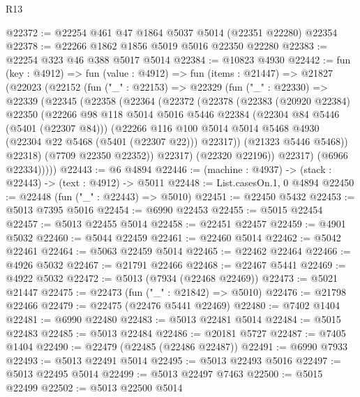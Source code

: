 \begin{lexlean}{R13}
\begin{coremodule}
@22372 := @22254 @461 @47 @1864 @5037 @5014 (@22351 @22280) @22354
@22378 := @22266 @1862 @1856 @5019 @5016 @22350 @22280
@22383 := @22254 @323 @46 @388 @5017 @5014
@22384 := @10823 @4930
@22442 := fun (key : @4912) =>
  fun (value : @4912) =>
  fun (items : @21447) =>
  @21827
    (@22023
      (@22152
        (fun ("_" : @22153) =>
        @22329
          (fun ("_" : @22330) =>
          @22339
            (@22345
              (@22358
                (@22364
                  (@22372
                    (@22378
                      (@22383
                        (@20920 @22384)
                        @22350
                        (@22266
                          @98
                          @118
                          @5014
                          @5016
                          @5446
                          @22384
                          (@22304 @84 @5446 (@5401 (@22307 @84)))
                          (@22266
                            @116
                            @100
                            @5014
                            @5014
                            @5468
                            @4930
                            (@22304 @22 @5468 (@5401 (@22307 @22)))
                            @22317))
                        (@21323 @5446 @5468))
                      @22318)
                    (@7709 @22350 @22352))
                  @22317)
                (@22320 @22196))
              @22317)
            (@6966 @22334)))))
@22443 := @6 @4894
@22446 := (machine : @4937) -> (stack : @22443) -> (text : @4912) -> @5011
@22448 := List.casesOn.{1, 0} @4894
@22450 := @22448 (fun ("_" : @22443) => @5010)
@22451 := @22450 @5432
@22453 := @5013 @7395 @5016
@22454 := @6990 @22453
@22455 := @5015 @22454
@22457 := @5013 @22455 @5014
@22458 := @22451 @22457
@22459 := @4901 @5032
@22460 := @5044 @22459
@22461 := @22460 @5014
@22462 := @5042 @22461
@22464 := @5063 @22459 @5014
@22465 := @22462 @22464
@22466 := @4926 @5032
@22467 := @21791 @22466
@22468 := @22467 @5441
@22469 := @4922 @5032
@22472 := @5013 (@7934 (@22468 @22469))
@22473 := @5021 @21447
@22475 := @22473 (fun ("_" : @21842) => @5010)
@22476 := @21798 @22466
@22479 := @22475 (@22476 @5441 @22469)
@22480 := @7402 @1404
@22481 := @6990 @22480
@22483 := @5013 @22481 @5014
@22484 := @5015 @22483
@22485 := @5013 @22484
@22486 := @20181 @5727
@22487 := @7405 @1404
@22490 := @22479 (@22485 (@22486 @22487))
@22491 := @6990 @7933
@22493 := @5013 @22491 @5014
@22495 := @5013 @22493 @5016
@22497 := @5013 @22495 @5014
@22499 := @5013 @22497 @7463
@22500 := @5015 @22499
@22502 := @5013 @22500 @5014

\end{coremodule}
\end{lexlean}
